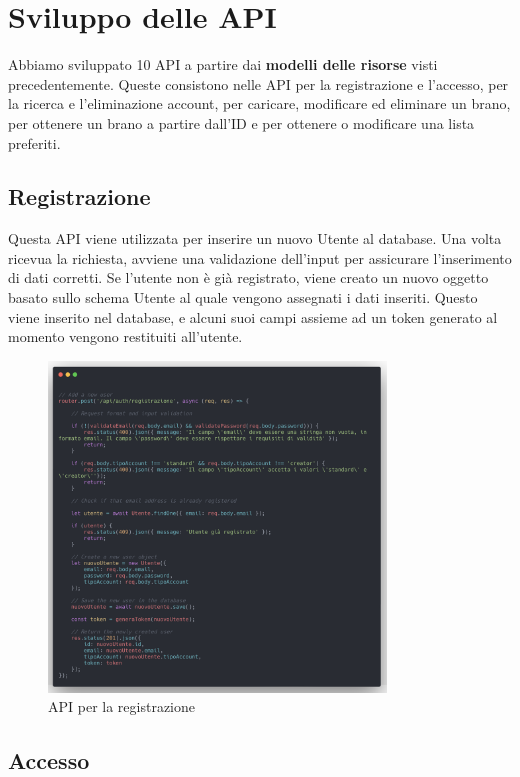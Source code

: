 \documentclass[a4paper,12pt]{article}
\begin{document}
\newpage
\section{Sviluppo delle API}

Abbiamo sviluppato 10 API a partire dai \textbf{modelli delle risorse} visti precedentemente. Queste consistono nelle API per la registrazione e l'accesso, per la ricerca e l'eliminazione account, per caricare, modificare ed eliminare un brano, per ottenere un brano a partire dall'ID e per ottenere o modificare una lista preferiti.

\subsection{Registrazione}

Questa API viene utilizzata per inserire un nuovo Utente al database. Una volta ricevua la richiesta, avviene una validazione dell'input per assicurare l'inserimento di dati corretti. Se l'utente non è già registrato, viene creato un nuovo oggetto basato sullo schema Utente al quale vengono assegnati i dati inseriti. Questo viene inserito nel database, e alcuni suoi campi assieme ad un token generato al momento vengono restituiti all'utente.

\begin{figure}[htp]
    \centering
    \includegraphics[width=0.8\textwidth]{source-code/api-registrazione.png}
    \caption{API per la registrazione}
\end{figure}

\subsection{Accesso}
\end{document}
